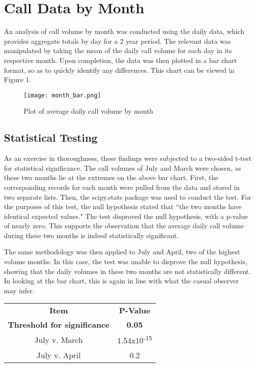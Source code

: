 \documentclass[11pt,twocolumn]{article}
\begin{document}
\section{Call Data by Month}
An analysis of call volume by month was conducted using the daily data, which provides aggregate totals by day for a 2 year period. The relevant data was manipulated by taking the mean of the daily call volume for each day in its respective month.  Upon completion, the data was then plotted in a bar chart format, so as to quickly identify any differences.  This chart can be viewed in Figure 1.

\begin{figure}[h]
  \texttt{[image: month\_bar.png]}
  \caption{Plot of average daily call volume by month}
\end{figure}

\subsection{Statistical Testing}
As an exercise in thoroughness, these findings were subjected to a two-sided t-test for statistical significance.  The call volumes of July and March were chosen, as these two months lie at the extremes on the above bar chart.  First, the corresponding records for each month were pulled from the data and stored in two separate lists.  Then, the scipy.stats package was used to conduct the test.  For the purposes of this test, the null hypothesis stated that ``the two months have identical expected values."  The test disproved the null hypothesis, with a p-value of nearly zero.  
This supports the observation that the average daily call volume during these two months is indeed statistically significant.
\par
The same methodology was then applied to July and April, two of the highest volume months.  In this case, the test was unable to disprove the null hypothesis, showing that the daily volumes in these two months are not statistically different.  In looking at the bar chart, this is again in line with what the casual observer may infer.
\begin{center}
\begin{tabular}{ |c|c| }
\hline 
 \textbf{Item} & \textbf{P-Value} \\
 \textbf{Threshold for significance} & \textbf{0.05} \\
 July v. March & 1.54x10\textsuperscript{-15} \\ 
 July v. April & 0.2 \\ 
 \hline
\end{tabular}
\end{center}
\end{document}
